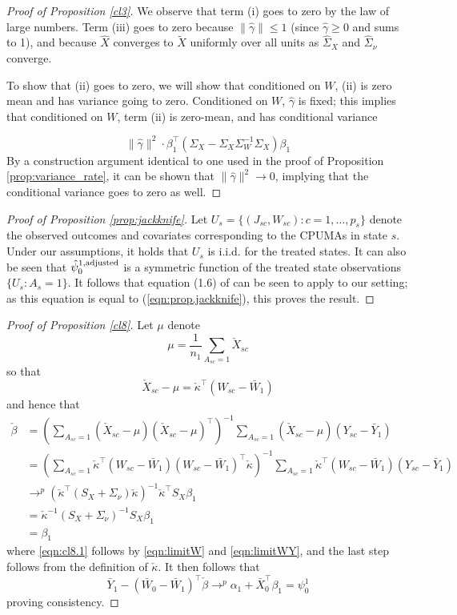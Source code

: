 \begin{proof}[Proof of Proposition \ref{cl3}]
We observe that term (i) goes to zero by the law of large numbers. Term (iii) goes to zero because $\|\hat{\gamma}\| \leq 1$ (since $\hat{\gamma} \geq 0$ and sums to 1), and because $\hat{X}$ converges to $\tilde{X}$ uniformly over all units as $\hat{\Sigma}_X$ and $\hat{\Sigma}_{\nu}$ converge. 

To show that (ii) goes to zero, we will show that conditioned on $W$, (ii) is zero mean and has variance going to zero. Conditioned on $W$, $\hat{\gamma}$ is fixed; this implies that conditioned on $W$, term (ii) is zero-mean, and has conditional variance 

\[ \|\hat{\gamma}\|^2 \cdot \beta_1^\top (\Sigma_X - \Sigma_X\Sigma_W^{-1}\Sigma_X) \beta_1\]
By a construction argument identical to one used in the proof of Proposition \ref{prop:variance_rate}, it can be shown that $\|\hat{\gamma}\|^2\rightarrow 0$, implying that the conditional variance goes to zero as well.
\end{proof}

\begin{proof}[Proof of Proposition \ref{prop:jackknife}]
Let $U_s = \{(J_{sc}, W_{sc}): c = 1,\ldots,p_s\}$ denote the observed outcomes and covariates corresponding to the CPUMAs in state $s$. Under our assumptions, it holds that $U_s$ is i.i.d. for the treated states. It can also be seen that $\hat{\psi}_0^{1,\textup{adjusted}}$ is a symmetric function of the treated state observations $\{U_s: A_s=1\}$. It follows that equation (1.6) of  \cite{efron1981jackknife} can be seen to apply to our setting; as this equation is equal to (\ref{eqn:prop.jackknife}), this proves the result.
\end{proof}

\begin{proof}[Proof of Proposition \ref{cl8}]
Let $\mu$ denote 
\[ \mu = \frac{1}{n_1} \sum_{A_{sc} = 1} \check{X}_{sc}\]
so that
\[ \check{X}_{sc} - \mu = \check{\kappa}^\top(W_{sc} - \bar{W}_1)\]
and hence that 
\begin{align}
 \nonumber \check{\beta} &=  \left(\sum_{A_{sc}=1} (\check{X}_{sc} - \mu)(\check{X}_{sc} - \mu)^\top\right)^{-1} \sum_{A_{sc}=1} (\check{X}_{sc} - \mu)(Y_{sc} - \bar{Y}_1) \\
 \nonumber & = \left(\sum_{A_{sc}=1} \check{\kappa}^\top (W_{sc} - \bar{W}_1)(W_{sc} - \bar{W}_1)^\top \check{\kappa}\right)^{-1} \sum_{A_{sc}=1} \check{\kappa}^\top(W_{sc} - \bar{W}_1)(Y_{sc} - \bar{Y}_1) \\
 & \to^p (\check{\kappa}^\top (S_X + \Sigma_\nu) \check{\kappa})^{-1} \check{\kappa}^\top S_X \beta_1  \label{eqn:cl8.1}\\
 \nonumber 
 & = \check{\kappa}^{-1} (S_X + \Sigma_{\nu})^{-1} S_X \beta_1 \\
 \nonumber 
 & = \beta_1
 \end{align}
 where \eqref{eqn:cl8.1} follows by \eqref{eqn:limitW} and \eqref{eqn:limitWY}, and the last step follows from the definition of $\check{\kappa}$. It then follows that 
 \[ \bar{Y}_1 - (\bar{W}_0 - \bar{W}_1)^\top \check{\beta} \to^p \alpha_1 + \bar{X}_0^\top \beta_1 = \psi_0^1\]
 proving consistency.
\end{proof}

